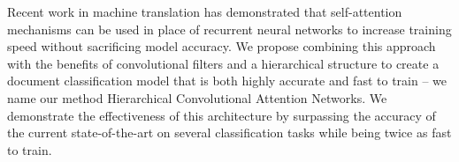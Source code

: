 Recent work in machine translation has demonstrated that self-attention mechanisms can be used in place of recurrent neural networks to increase training speed without sacrificing model accuracy. We propose combining this approach with the benefits of convolutional filters and a hierarchical structure to create a document classification model that is both highly accurate and fast to train -- we name our method Hierarchical Convolutional Attention Networks. We demonstrate the effectiveness of this architecture by surpassing the accuracy of the current state-of-the-art on several classification tasks while being twice as fast to train.
